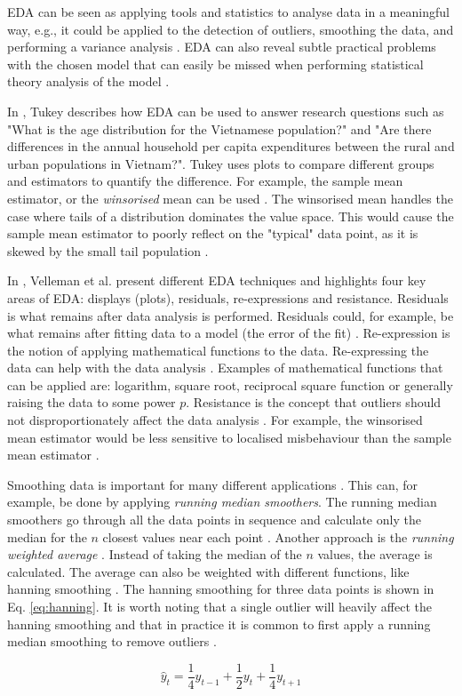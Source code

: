 EDA can be seen as applying tools and statistics to analyse data in a meaningful way, e.g., it could be applied to the detection of outliers, smoothing the data, and performing a variance analysis \cite{Anselin1999, Hoaglin2003, Tukey1977, Velleman1981}.
EDA can also reveal subtle practical problems with the chosen model that can easily be missed when performing statistical theory analysis of the model \cite{Gelman2003}.

In \cite{Tukey1977}, Tukey describes how EDA can be used to answer research questions such as "What is the age distribution for the Vietnamese population?" and "Are there differences in
the annual household per capita expenditures between the rural and urban populations in Vietnam?".
Tukey uses plots to compare different groups and estimators to quantify the difference.
For example, the sample mean estimator, or the \emph{winsorised} mean can be used \cite{Tukey1977}.
The winsorised mean handles the case where tails of a distribution dominates the value space.  
This would cause the sample mean estimator to poorly reflect on the "typical" data point, as it is skewed by the small tail population \cite{Tukey1977}.

In \cite{Velleman1981}, Velleman et al. present different EDA techniques and highlights four key areas of EDA: displays (plots), residuals, re-expressions and resistance.
Residuals is what remains after data analysis is performed.
Residuals could, for example, be what remains after fitting data to a model (the error of the fit) \cite{Velleman1981}.
Re-expression is the notion of applying mathematical functions to the data.
Re-expressing the data can help with the data analysis \cite{Hoaglin2003, Velleman1981}.
Examples of mathematical functions that can be applied are: logarithm, square root, reciprocal square function or generally raising the data to some power $p$.
Resistance is the concept that outliers should not disproportionately affect the data analysis \cite{Hoaglin2003, Velleman1981}.
For example, the winsorised mean estimator would be less sensitive to localised misbehaviour than the sample mean estimator \cite{Tukey1977}.

Smoothing data is important for many different applications \cite{Bradley1997, Pang2002, Quinlan1992, Velleman1981}.
This can, for example, be done by applying \emph{running median smoothers}.
The running median smoothers go through all the data points in sequence and calculate only the median for the $n$ closest values near each point \cite{Velleman1981}.
Another approach is the \emph{running weighted average} \cite{Velleman1981}.
Instead of taking the median of the $n$ values, the average is calculated.
The average can also be weighted with different functions, like hanning smoothing \cite{Velleman1981}.
The hanning smoothing for three data points is shown in Eq. \ref{eq:hanning}.
It is worth noting that a single outlier will heavily affect the hanning smoothing and that in practice it is common to first apply a running median smoothing to remove outliers \cite{Velleman1981}.

\begin{equation}
    \hat y_t = \frac{1}{4} y_{t-1} + \frac{1}{2} y_t + \frac{1}{4} y_{t + 1} 
    \label{eq:hanning}
\end{equation}
